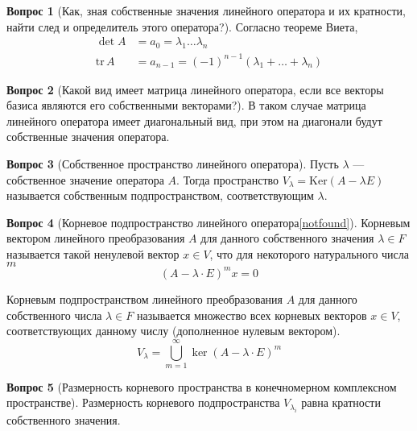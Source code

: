\documentclass[a4paper,11pt]{article}
\theoremstyle{remark}
\theoremstyle{definition}
\newtheorem{question}{Вопрос}
\begin{document}
\begin{question}[Как, зная собственные значения линейного оператора и их кратности, найти след и определитель этого оператора?]
Согласно теореме Виета, 
\begin{align*}
	\det A &= a_0 = \lambda_1 \dots \lambda_n \\
	\mathrm{tr}\,A &= a_{n-1} = (-1)^{n-1} (\lambda_1 + \dots + \lambda_n)
\end{align*}
\end{question}


\begin{question}[Какой вид имеет матрица линейного оператора, если все векторы базиса являются его собственными векторами?]
В таком случае матрица линейного оператора имеет диагональный вид, при этом на диагонали будут собственные значения оператора.
\end{question}


\begin{question}[Собственное пространство линейного оператора]
Пусть \(\lambda\) --- собственное значение оператора \(A\). Тогда пространство \(V_{\lambda} = \mathrm{Ker}(A - \lambda{}E)\) называется собственным подпространством, соответствующим \(\lambda\).
\end{question}


\begin{question}[Корневое подпространство линейного оператора\cref{notfound}]
Корневым вектором линейного преобразования \(A\) для данного собственного значения \(\lambda \in F\) называется такой ненулевой вектор \(x \in V\), что для некоторого натурального числа \(m\)
\begin{equation*}
 	(A - \lambda \cdot E)^mx = 0
\end{equation*} 

Корневым подпространством линейного преобразования \(A\) для данного собственного числа \(\lambda \in F\) называется множество всех корневых векторов \(x \in V\), соответствующих данному числу (дополненное нулевым вектором).
\begin{equation*}
	V_{\lambda} = \bigcup_{m = 1}^{\infty} \ker(A - \lambda \cdot E)^m
\end{equation*}
\end{question}


\begin{question}[Размерность корневого пространства в конечномерном комплексном пространстве]
Размерность корневого подпространства \(V_{\lambda_i}\) равна кратности собственного значения.
\end{question}
\end{document}
